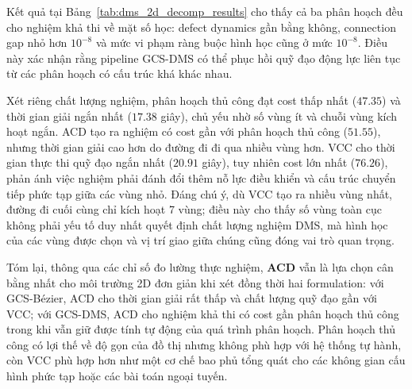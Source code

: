 Kết quả tại Bảng~\ref{tab:dms_2d_decomp_results} cho thấy cả ba phân hoạch đều cho nghiệm khả thi về mặt số học: defect dynamics gần bằng không, connection gap nhỏ hơn $10^{-8}$ và mức vi phạm ràng buộc hình học cũng ở mức $10^{-8}$. Điều này xác nhận rằng pipeline GCS-DMS có thể phục hồi quỹ đạo động lực liên tục từ các phân hoạch có cấu trúc khá khác nhau.

Xét riêng chất lượng nghiệm, phân hoạch thủ công đạt cost thấp nhất ($47.35$) và thời gian giải ngắn nhất ($17.38$ giây), chủ yếu nhờ số vùng ít và chuỗi vùng kích hoạt ngắn. ACD tạo ra nghiệm có cost gần với phân hoạch thủ công ($51.55$), nhưng thời gian giải cao hơn do đường đi đi qua nhiều vùng hơn. VCC cho thời gian thực thi quỹ đạo ngắn nhất ($20.91$ giây), tuy nhiên cost lớn nhất ($76.26$), phản ánh việc nghiệm phải đánh đổi thêm nỗ lực điều khiển và cấu trúc chuyển tiếp phức tạp giữa các vùng nhỏ. Đáng chú ý, dù VCC tạo ra nhiều vùng nhất, đường đi cuối cùng chỉ kích hoạt 7 vùng; điều này cho thấy số vùng toàn cục không phải yếu tố duy nhất quyết định chất lượng nghiệm DMS, mà hình học của các vùng được chọn và vị trí giao giữa chúng cũng đóng vai trò quan trọng.

Tóm lại, thông qua các chỉ số đo lường thực nghiệm, \textbf{ACD} vẫn là lựa chọn cân bằng nhất cho môi trường 2D đơn giản khi xét đồng thời hai formulation: với GCS-Bézier, ACD cho thời gian giải rất thấp và chất lượng quỹ đạo gần với VCC; với GCS-DMS, ACD cho nghiệm khả thi có cost gần phân hoạch thủ công trong khi vẫn giữ được tính tự động của quá trình phân hoạch. Phân hoạch thủ công có lợi thế về độ gọn của đồ thị nhưng không phù hợp với hệ thống tự hành, còn VCC phù hợp hơn như một cơ chế bao phủ tổng quát cho các không gian cấu hình phức tạp hoặc các bài toán ngoại tuyến.
